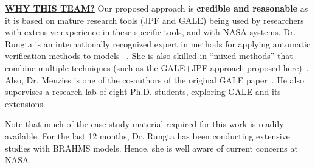\documentclass[12pt]{article}
\begin{document}
\underline{{\bf  WHY THIS TEAM?}} 
Our proposed approach is {\bf credible and reasonable} as it is based on mature research tools (JPF and GALE)
being used by researchers with extensive experience in these specific tools, and with NASA systems.
Dr. Rungta is an internationally recognized expert in
methods for applying automatic verification methods to models
~\cite{Rungta:2013,hunter:aamas13,backes:2013,rungta2012change,pasareanu:ase10,rungta2009efficient}.
She is also skilled in ``mixed methods'' that combine multiple techniques (such as the GALE+JPF approach
proposed here)~\cite{puasuareanu2011symbolic}.
Also,
Dr. Menzies is one of the co-authors of the original GALE 
paper~\cite{krall2015gale}. He also supervises
a research lab of eight Ph.D. students,  exploring  GALE and its extensions.


Note that much of the case study material required for this
work is readily available. For the last
12 months, Dr. Rungta has been conducting extensive studies
with BRAHMS models. Hence, she is well aware of current
concerns at NASA.
 

\newpage


\end{document}
